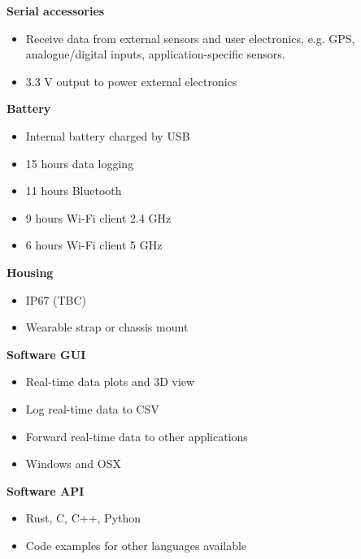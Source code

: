 \begin{multicols}{2}
\textbf{Serial accessories}
\begin{itemize}[nolistsep]
    \item Receive data from external sensors and user electronics, e.g. \acs{GPS}, analogue/digital inputs, application-specific sensors.
    \item 3.3 V output to power external electronics
\end{itemize}

\textbf{Battery}
\begin{itemize}[nolistsep]
    \item Internal battery charged by \acs{USB}
    \item 15 hours data logging
    \item 11 hours Bluetooth
    \item 9 hours Wi-Fi client 2.4 GHz
    \item 6 hours Wi-Fi client 5 GHz
\end{itemize}

\textbf{Housing}
\begin{itemize}[nolistsep]
    \item IP67 (TBC)
    \item Wearable strap or chassis mount
\end{itemize}

\textbf{Software \acs{GUI}}
\begin{itemize}[nolistsep]
    \item Real-time data plots and 3D view
    \item Log real-time data to \acs{CSV}
    \item Forward real-time data to other applications
    \item Windows and OSX
\end{itemize}

\textbf{Software \acs{API}}
\begin{itemize}[nolistsep]
    \item Rust, C, C++, Python
    \item Code examples for other languages available
\end{itemize}

\end{multicols}

\clearpage
